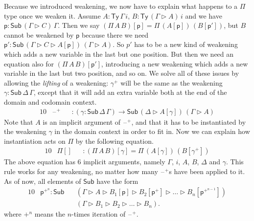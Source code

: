 \documentclass[sigplan,10pt,anonymous,review]{acmart}\settopmatter{printfolios=true,printccs=false,printacmref=false}
\newcommand{\ra}{\rightarrow}
\newcommand{\Ty}{\mathsf{Ty}}
\newcommand{\Sub}{\mathsf{Sub}}
\newcommand{\p}{\mathsf{p}}
\newcommand{\ext}{\mathop{\triangleright}}
\newcommand{\blank}{\mathord{\hspace{1pt}\text{--}\hspace{1pt}}} %
\begin{document}
Because we introduced weakening, we now have to explain what happens
to a $\Pi$ type once we weaken it. Assume $A : \Ty\,\Gamma\,i$,
$B:\Ty\,(\Gamma\ext A)\,i$ and we have $\p:\Sub\,(\Gamma\ext
C)\,\Gamma$. Then we say $(\Pi\,A\,B)[\p] = \Pi\,(A[\p])\,(B[\p'])$,
but $B$ cannot be weakened by $\p$ because there we need $\p' :
\Sub\,(\Gamma\ext C\ext A[\p])\,(\Gamma\ext A)$. So $p'$ has to be a
new kind of weakening which adds a new variable in the last but one
position. But then we need an equation also for $(\Pi\,A\,B)[\p']$,
introducing a new weakening which adds a new variable in the last but
two position, and so on. We solve all of these issues by allowing the
\emph{lifting} of a weakening: $\gamma^+$ will be the same as the
weakening $\gamma : \Sub\,\Delta\,\Gamma$, except that it will add an
extra variable both at the end of the domain and codomain
context.
\begin{alignat*}{10}
& \blank^+ && : (\gamma:\Sub\,\Delta\,\Gamma)\ra\Sub\,(\Delta\ext A[\gamma])\,(\Gamma\ext A)
\end{alignat*}
Note that $A$ is an implicit argument of $\blank^+$, and that it has
to be instantiated by the weakening $\gamma$ in the domain context in
order to fit in. Now we can explain how instantiation acts on $\Pi$ by
the following equation.
\begin{alignat*}{10}
& \Pi[] && : (\Pi\,A\,B)[\gamma] = \Pi\,(A[\gamma])\,(B[\gamma^+])
\end{alignat*}
The above equation has 6 implicit arguments, namely $\Gamma$, $i$,
$A$, $B$, $\Delta$ and $\gamma$.  This rule works for any weakening,
no matter how many $\blank^+$s have been applied to it. As of now, all
elements of $\Sub$ have the form
\begin{alignat*}{10}
  & \p^{+^n} : \Sub\, && (\Gamma\ext A\ext B_1[\p]\ext B_2[\p^+]\ext\dots\ext B_n[\p^{+^{n-1}}]) \\
  & && (\Gamma\ext B_1\ext B_2\ext\dots\ext B_n).
\end{alignat*}
where $+^n$ means the $n$-times iteration of $\blank^+$.
\end{document}
